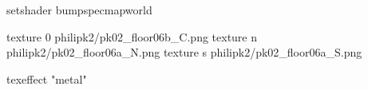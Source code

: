 setshader bumpspecmapworld

texture 0 philipk2/pk02_floor06b_C.png
texture n philipk2/pk02_floor06a_N.png
texture s philipk2/pk02_floor06a_S.png

texeffect "metal"

